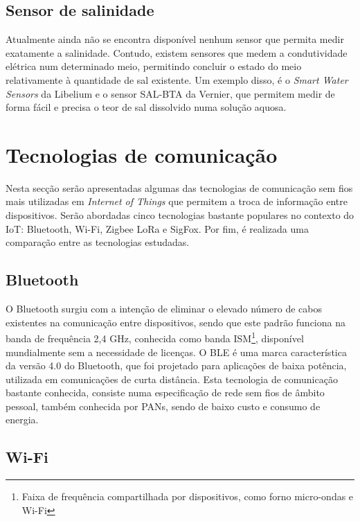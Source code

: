 \subsection{Sensor de salinidade}

Atualmente ainda não se encontra disponível nenhum sensor que permita medir exatamente a salinidade. Contudo, existem sensores que medem a condutividade elétrica num determinado meio, permitindo concluir o estado do meio relativamente à quantidade de sal existente. 
Um exemplo disso, é o \textit{Smart Water Sensors} da Libelium\cite{World2014}  e o sensor SAL-BTA da Vernier\cite{sall}, que permitem medir de forma fácil e precisa o teor de sal dissolvido numa solução aquosa.

\section{Tecnologias de comunicação}
\label{state-tecc}
Nesta secção serão apresentadas algumas das tecnologias de comunicação sem fios mais utilizadas em \textit{Internet of Things} que permitem a troca de informação entre dispositivos. Serão abordadas cinco tecnologias bastante populares no contexto do \ac{IoT}: Bluetooth, Wi-Fi, Zigbee LoRa e SigFox. Por fim, é realizada uma comparação entre as tecnologias estudadas. 


\subsection{Bluetooth}

O Bluetooth surgiu com a intenção de eliminar o elevado número de cabos existentes na comunicação entre dispositivos, sendo que este padrão funciona na banda de frequência 2,4 GHz, conhecida como banda \ac{ISM}\footnote{Faixa de frequência compartilhada por dispositivos, como forno micro-ondas e Wi-Fi}, disponível mundialmente sem a necessidade de licenças. O \ac{BLE} é uma marca característica da versão 4.0 do Bluetooth, que foi projetado para aplicações de baixa potência, utilizada em comunicações de curta distância. Esta tecnologia de comunicação bastante conhecida, consiste numa especificação de rede sem fios de âmbito pessoal, também conhecida por \ac{PANs}, sendo de baixo custo e consumo de energia\cite{Bruno2002}\cite{BluetoothTM2001}.


\subsection{Wi-Fi}


